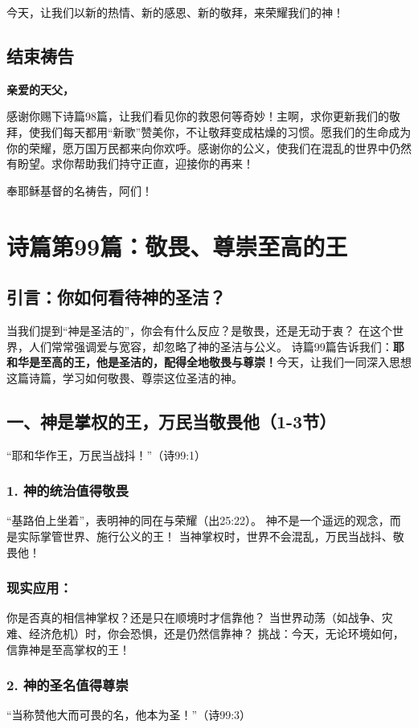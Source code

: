 \documentclass[a4paper, 12pt]{article}
\begin{document}
今天，让我们以新的热情、新的感恩、新的敬拜，来荣耀我们的神！

\subsection*{结束祷告}
\textbf{亲爱的天父，}

感谢你赐下诗篇98篇，让我们看见你的救恩何等奇妙！主啊，求你更新我们的敬拜，使我们每天都用“新歌”赞美你，不让敬拜变成枯燥的习惯。愿我们的生命成为你的荣耀，愿万国万民都来向你欢呼。感谢你的公义，使我们在混乱的世界中仍然有盼望。求你帮助我们持守正直，迎接你的再来！

奉耶稣基督的名祷告，阿们！
\newpage
\section{诗篇第99篇：敬畏、尊崇至高的王}
\subsection*{引言：你如何看待神的圣洁？}
当我们提到“神是圣洁的”，你会有什么反应？是敬畏，还是无动于衷？
在这个世界，人们常常强调爱与宽容，却忽略了神的圣洁与公义。
诗篇99篇告诉我们：\textbf{耶和华是至高的王，他是圣洁的，配得全地敬畏与尊崇！}今天，让我们一同深入思想这篇诗篇，学习如何敬畏、尊崇这位圣洁的神。

\subsection*{一、神是掌权的王，万民当敬畏他（1-3节）}
“耶和华作王，万民当战抖！”（诗99:1）

\subsubsection*{1. 神的统治值得敬畏}
“基路伯上坐着”，表明神的同在与荣耀（出25:22）。
神不是一个遥远的观念，而是实际掌管世界、施行公义的王！
当神掌权时，世界不会混乱，万民当战抖、敬畏他！
\subsubsection*{现实应用：}

你是否真的相信神掌权？还是只在顺境时才信靠他？
当世界动荡（如战争、灾难、经济危机）时，你会恐惧，还是仍然信靠神？
挑战：今天，无论环境如何，信靠神是至高掌权的王！

\subsubsection*{2. 神的圣名值得尊崇}
“当称赞他大而可畏的名，他本为圣！”（诗99:3）
\end{document}

